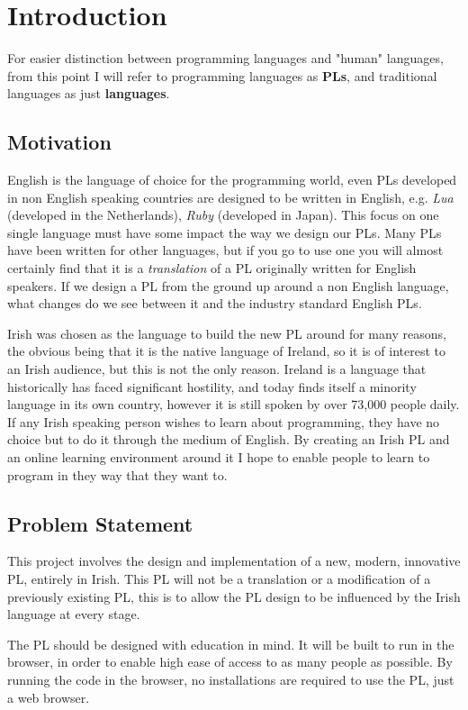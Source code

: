 \chapter{Introduction}
For easier distinction between programming languages and "human" languages, from this point I will refer to programming languages as \textbf{PLs}, and traditional languages as just \textbf{languages}.
\section{Motivation}
English is the language of choice for the programming world, even PLs developed in non English speaking countries are designed to be written in English, e.g. \emph{Lua} (developed in the Netherlands), \emph{Ruby} (developed in Japan). This focus on one single language must have some impact the way we design our PLs. Many PLs have been written for other languages, but if you go to use one you will almost certainly find that it is a \emph{translation} of a PL originally written for English speakers\cite{wikipllist}. If we design a PL from the ground up around a non English language, what changes do we see between it and the industry standard English PLs.

Irish was chosen as the language to build the new PL around for many reasons, the obvious being that it is the native language of Ireland, so it is of interest to an Irish audience, but this is not the only reason. Ireland is a language that historically has faced significant hostility, and today finds itself a minority language in its own country, however it is still spoken by over 73,000 people daily\cite{csoirish}. If any Irish speaking person wishes to learn about programming, they have no choice but to do it through the medium of English. By creating an Irish PL and an online learning environment around it I hope to enable people to learn to program in they way that they want to.
\section{Problem Statement}
This project involves the design and implementation of a new, modern, innovative PL, entirely in Irish. This PL will not be a translation or a modification of a previously existing PL, this is to allow the PL design to be influenced by the Irish language at every stage.

The PL should be designed with education in mind. It will be built to run in the browser, in order to enable high ease of access to as many people as possible. By running the code in the browser, no installations are required to use the PL, just a web browser.

